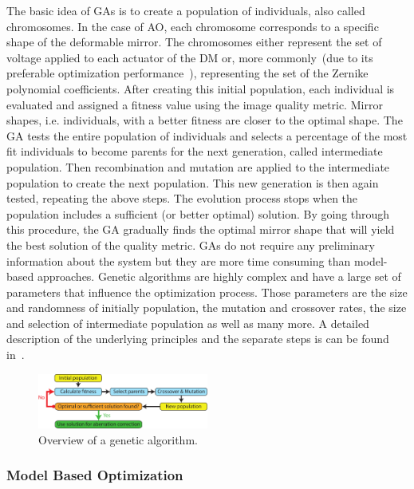 The basic idea of GAs is to create a population of individuals, also called chromosomes. In the case of AO, each chromosome corresponds to a specific shape of the deformable mirror. The chromosomes either represent the set of voltage applied to each actuator of the DM or, more commonly~(due to its preferable optimization performance~\cite{Genetic_smart_algorithm}), representing the set of the Zernike polynomial coefficients. After creating this initial population, each individual is evaluated and assigned a fitness value using the image quality metric. Mirror shapes, i.e. individuals, with a better fitness are closer to the optimal shape. The GA tests the entire population of individuals and selects a percentage of the most fit individuals to become parents for the next generation, called intermediate population. Then recombination and mutation are applied to the intermediate population to create the next population. This new generation is then again tested, repeating the above steps. The evolution process stops when the population includes a sufficient (or better optimal) solution. By going through this procedure, the GA gradually finds the optimal mirror shape that will yield the best solution of the quality metric. GAs do not require any preliminary information about the system but they are more time consuming than model-based approaches. Genetic algorithms are highly complex and have a large set of parameters  that influence the optimization process. Those parameters are the size and randomness of initially population, the mutation and crossover rates, the size and selection of intermediate population as well as many more. A detailed description of the underlying principles and the separate steps is can be found in~\cite{Genetic_tutorial}.

\begin{figure}[htbp]
	\centering
		\includegraphics[width=0.50\textwidth]{images/genetic_algorithm_overview.pdf}
	\caption{Overview of a genetic algorithm. }
	\label{fig:genetic_algorithm_overview}
\end{figure}


\subsubsection{Model Based Optimization}
\label{sec:ModelBasedSensing}

